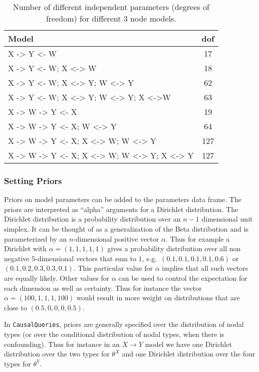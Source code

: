 \documentclass[
  11pt,
  article]{jss}
\begin{document}
\hypertarget{tbl-dof}{}
\begin{table}
\caption{\label{tbl-dof}Number of different independent parameters (degrees of freedom) for
different 3 node models. }\tabularnewline

\centering
\begin{tabular}{lc}
\toprule
Model & dof\\
\midrule
X -> Y <- W & 17\\
X -> Y <- W; X <-> W & 18\\
X -> Y <- W; X <-> Y; W <-> Y & 62\\
X -> Y <- W; X <-> Y; W <-> Y; X <->W & 63\\
X -> W -> Y <- X & 19\\
X -> W -> Y <- X; W <-> Y & 64\\
X -> W -> Y <- X; X <-> W; W <-> Y & 127\\
X -> W -> Y <- X; X <-> W; W <-> Y; X <-> Y & 127\\
\bottomrule
\end{tabular}
\end{table}

\hypertarget{priors}{%
\subsubsection{Setting Priors}\label{priors}}

Priors on model parameters can be added to the parameters data frame.
The priors are interpreted as ``alpha'' arguments for a Dirichlet
distribution. The Dirichlet distribution is a probability distribution
over an \(n-1\) dimensional unit simplex. It can be thought of as a
generalization of the Beta distribution and is parameterized by an
\(n\)-dimensional positive vector \(\alpha\). Thus for example a
Dirichlet with \(\alpha = (1, 1, 1, 1, 1)\) gives a probability
distribution over all non negative \(5\)-dimensional vectors that sum to
\(1\), e.g.~\((0.1, 0.1, 0.1, 0.1, 0.6)\) or
\((0.1, 0.2, 0.3, 0.3, 0.1)\). This particular value for \(\alpha\)
implies that all such vectors are equally likely. Other values for
\(\alpha\) can be used to control the expectation for each dimension as
well as certainty. Thus for instance the vector
\(\alpha = (100, 1, 1, 1, 100)\) would result in more weight on
distributions that are close to \((0.5, 0, 0, 0, 0.5)\).

In \texttt{CausalQueries}, priors are generally specified over the
distribution of nodal types (or over the conditional distribution of
nodal types, when there is confounding). Thus for instance in an
\(X \rightarrow Y\) model we have one Dirichlet distribution over the
two types for \(\theta^X\) and one Dirichlet distribution over the four
types for \(\theta^Y\).
\end{document}
